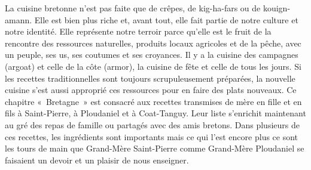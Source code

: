 La cuisine bretonne n’est pas faite que de crêpes, de kig-ha-fars ou de kouign-amann. Elle est bien plus riche et, avant tout, elle fait partie de notre culture et notre identité. Elle représente notre terroir parce qu’elle est le fruit de la rencontre des ressources naturelles, produits locaux agricoles et de la pêche, avec un peuple, ses us, ses coutumes et ses croyances. Il y a la cuisine des campagnes (argoat) et celle de la côte (armor), la cuisine de fête et celle de tous les jours. Si les recettes traditionnelles sont toujours scrupuleusement préparées, la nouvelle cuisine s’est aussi approprié ces ressources pour en faire des plats nouveaux.
Ce chapitre « Bretagne » est consacré aux recettes transmises de mère en fille et en fils à Saint-Pierre, à Ploudaniel et à Coat-Tanguy. Leur liste s’enrichit maintenant au gré des repas de famille ou partagés avec des amis bretons. Dans plusieurs de ces recettes, les ingrédients sont importants mais ce qui l’est encore plus ce sont les tours de main que Grand-Mère Saint-Pierre comme Grand-Mère Ploudaniel se faisaient un devoir et un plaisir de nous enseigner.

